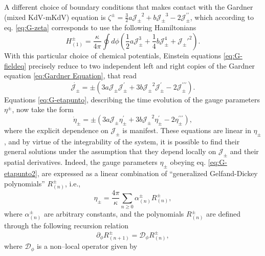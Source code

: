 \documentclass[letterpaper,11pt,oneside]{book}
\begin{document}
A different choice of boundary conditions that makes contact with
the Gardner (mixed KdV-mKdV) equation is $\zeta^{\pm}=\frac{3}{2}a\mathcal{J_{\pm}}^{2}+b\mathcal{J_{\pm}}^{3}-2\mathcal{J_{\pm}^{\prime\prime}}$,
which according to eq. \eqref{eq:G-zeta} corresponds to use the following
Hamiltonians
\begin{equation}
	H_{\left(1\right)}^{\pm}=\frac{\kappa}{4\pi}\oint d\phi\left(\frac{1}{2}a\mathcal{J}_{\pm}^{3}+\frac{1}{4}b\mathcal{J}_{\pm}^{4}+\mathcal{J}_{\pm}'^{2}\right).\label{eq:G-H(1)}
\end{equation}
With this particular choice of chemical potentials, Einstein equations
\eqref{eq:G-fieldeq} precisely reduce to two independent left and
right copies of the Gardner equation \eqref{eq:Gardner Equation}, that read
\begin{equation}
	\dot{\mathcal{J}_{\pm}}=\pm\left(3a\mathcal{J_{\pm}}\mathcal{J_{\pm}^{\prime}}+3b\mathcal{J_{\pm}}^{2}\mathcal{J_{\pm}^{\prime}}-2\mathcal{J_{\pm}^{\prime\prime\prime}}\right).\label{eq:G-mixedkdvmkdv}
\end{equation}
Equations \eqref{eq:G-etapunto}, describing the time evolution of
the gauge parameters $\eta^{\pm}$, now take the form 
\begin{equation}
	\dot{\eta}_{\pm}=\pm\left(3a\mathcal{J_{\pm}}\eta_{\pm}^{\prime}+3b\mathcal{J_{\pm}}^{2}\eta_{\pm}^{\prime}-2\eta_{\pm}^{\prime\prime\prime}\right),\label{eq:G-etapunto2}
\end{equation}
where the explicit dependence on $\mathcal{J_{\pm}}$ is manifest.
These equations are linear in $\eta_{\pm}$, and by virtue of the
integrability of the system, it is possible to find their general
solutions under the assumption that they depend locally on $\mathcal{J_{\pm}}$
and their spatial derivatives. Indeed, the gauge parameters $\eta_{\pm}$
obeying eq. \eqref{eq:G-etapunto2}, are expressed as a linear combination
of ``generalized Gelfand-Dickey polynomials'' $R_{\left(n\right)}^{\pm}$,
i.e.,
\begin{equation}
	\eta_{\pm}=\frac{4\pi}{\kappa}\sum_{n\geq0}\alpha_{\left(n\right)}^{\pm}R_{\left(n\right)}^{\pm},\label{eq:G-etasol}
\end{equation}
where $\alpha_{\left(n\right)}^{\pm}$ are arbitrary constants, and
the polynomials $R_{\left(n\right)}^{\pm}$ are defined through the
following recursion relation
\begin{equation}
	\partial_{\phi}R_{(n+1)}^{\pm}=\mathcal{D}_{\phi}R_{(n)}^{\pm},\label{eq:G-recurrenciarel}
\end{equation}
where $\mathcal{D}_{\phi}$ is a non--local operator given by
\end{document}
